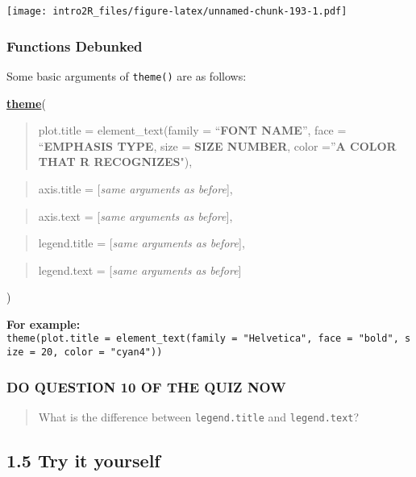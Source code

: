 \documentclass[
]{book}
\begin{document}
\texttt{[image: intro2R\_files/figure-latex/unnamed-chunk-193-1.pdf]}

\hypertarget{functions-debunked-20}{%
\subsubsection{Functions Debunked}\label{functions-debunked-20}}

Some basic arguments of \texttt{theme()} are as follows:

\textbf{\href{https://ggplot2.tidyverse.org/reference/theme.html}{theme}}(

\begin{quote}
plot.title = element\_text(family = ``\textbf{FONT NAME}'', face = ``\textbf{EMPHASIS TYPE}, size = \textbf{SIZE NUMBER}, color =''\textbf{A COLOR THAT R RECOGNIZES}"),
\end{quote}

\begin{quote}
axis.title = {[}\emph{same arguments as before}{]},
\end{quote}

\begin{quote}
axis.text = {[}\emph{same arguments as before}{]},
\end{quote}

\begin{quote}
legend.title = {[}\emph{same arguments as before}{]},
\end{quote}

\begin{quote}
legend.text = {[}\emph{same arguments as before}{]}
\end{quote}

)

\textbf{For example:} \texttt{theme(plot.title\ =\ element\_text(family\ =\ "Helvetica",\ face\ =\ "bold",\ size\ =\ 20,\ color\ =\ "cyan4"))}

\hypertarget{do-question-10-of-the-quiz-now-2}{%
\subsubsection{DO QUESTION 10 OF THE QUIZ NOW}\label{do-question-10-of-the-quiz-now-2}}

\begin{quote}
What is the difference between \texttt{legend.title} and \texttt{legend.text}?
\end{quote}

\hypertarget{try-it-yourself-27}{%
\subsection{1.5 Try it yourself}\label{try-it-yourself-27}}
\end{document}
